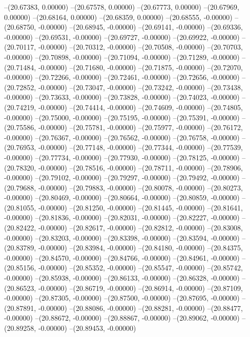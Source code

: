 --(20.67383, 0.00000)
--(20.67578, 0.00000)
--(20.67773, 0.00000)
--(20.67969, 0.00000)
--(20.68164, 0.00000)
--(20.68359, 0.00000)
--(20.68555, -0.00000)
--(20.68750, -0.00000)
--(20.68945, -0.00000)
--(20.69141, -0.00000)
--(20.69336, -0.00000)
--(20.69531, -0.00000)
--(20.69727, -0.00000)
--(20.69922, -0.00000)
--(20.70117, -0.00000)
--(20.70312, -0.00000)
--(20.70508, -0.00000)
--(20.70703, -0.00000)
--(20.70898, -0.00000)
--(20.71094, -0.00000)
--(20.71289, -0.00000)
--(20.71484, -0.00000)
--(20.71680, -0.00000)
--(20.71875, -0.00000)
--(20.72070, -0.00000)
--(20.72266, -0.00000)
--(20.72461, -0.00000)
--(20.72656, -0.00000)
--(20.72852, -0.00000)
--(20.73047, -0.00000)
--(20.73242, -0.00000)
--(20.73438, -0.00000)
--(20.73633, -0.00000)
--(20.73828, -0.00000)
--(20.74023, -0.00000)
--(20.74219, -0.00000)
--(20.74414, -0.00000)
--(20.74609, -0.00000)
--(20.74805, -0.00000)
--(20.75000, -0.00000)
--(20.75195, -0.00000)
--(20.75391, -0.00000)
--(20.75586, -0.00000)
--(20.75781, -0.00000)
--(20.75977, -0.00000)
--(20.76172, -0.00000)
--(20.76367, -0.00000)
--(20.76562, -0.00000)
--(20.76758, -0.00000)
--(20.76953, -0.00000)
--(20.77148, -0.00000)
--(20.77344, -0.00000)
--(20.77539, -0.00000)
--(20.77734, -0.00000)
--(20.77930, -0.00000)
--(20.78125, -0.00000)
--(20.78320, -0.00000)
--(20.78516, -0.00000)
--(20.78711, -0.00000)
--(20.78906, -0.00000)
--(20.79102, -0.00000)
--(20.79297, -0.00000)
--(20.79492, -0.00000)
--(20.79688, -0.00000)
--(20.79883, -0.00000)
--(20.80078, -0.00000)
--(20.80273, -0.00000)
--(20.80469, -0.00000)
--(20.80664, -0.00000)
--(20.80859, -0.00000)
--(20.81055, -0.00000)
--(20.81250, -0.00000)
--(20.81445, -0.00000)
--(20.81641, -0.00000)
--(20.81836, -0.00000)
--(20.82031, -0.00000)
--(20.82227, -0.00000)
--(20.82422, -0.00000)
--(20.82617, -0.00000)
--(20.82812, -0.00000)
--(20.83008, -0.00000)
--(20.83203, -0.00000)
--(20.83398, -0.00000)
--(20.83594, -0.00000)
--(20.83789, -0.00000)
--(20.83984, -0.00000)
--(20.84180, -0.00000)
--(20.84375, -0.00000)
--(20.84570, -0.00000)
--(20.84766, -0.00000)
--(20.84961, -0.00000)
--(20.85156, -0.00000)
--(20.85352, -0.00000)
--(20.85547, -0.00000)
--(20.85742, -0.00000)
--(20.85938, -0.00000)
--(20.86133, -0.00000)
--(20.86328, -0.00000)
--(20.86523, -0.00000)
--(20.86719, -0.00000)
--(20.86914, -0.00000)
--(20.87109, -0.00000)
--(20.87305, -0.00000)
--(20.87500, -0.00000)
--(20.87695, -0.00000)
--(20.87891, -0.00000)
--(20.88086, -0.00000)
--(20.88281, -0.00000)
--(20.88477, -0.00000)
--(20.88672, -0.00000)
--(20.88867, -0.00000)
--(20.89062, -0.00000)
--(20.89258, -0.00000)
--(20.89453, -0.00000)
